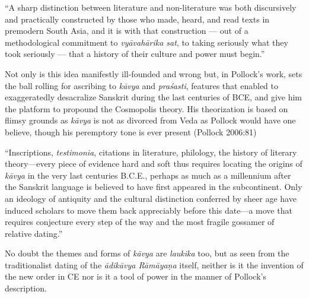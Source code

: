 \begin{myquote}
“A sharp distinction between literature and non-literature was both discursively and practically constructed by those who made, heard, and read texts in premodern South Asia, and it is with that construction — out of a methodological commitment to \textit{vyāvahārika sat}, to taking seriously what they took seriously — that a history of their culture and power must begin.”
\end{myquote}

Not only is this idea manifestly ill-founded and wrong but, in Pollock’s work, sets the ball rolling for ascribing to \textit{kāvya} and \textit{praśasti}, features that enabled to exaggeratedly desacralize Sanskrit during the last centuries of BCE, and give him the platform to propound the Cosmopolis theory. His theorization is based on flimsy grounds as \textit{kāvya} is not as divorced from Veda as Pollock would have one believe, though his peremptory tone is ever present (Pollock 2006:81)

\begin{myquote}
“Inscriptions, \textit{testimonia}, citations in literature, philology, the history of literary theory—every piece of evidence hard and soft thus requires locating the origins of \textit{kāvya} in the very last centuries B.C.E., perhaps as much as a millennium after the Sanskrit language is believed to have first appeared in the subcontinent. Only an ideology of antiquity and the cultural distinction conferred by sheer age have induced scholars to move them back appreciably before this date—a move that requires conjecture every step of the way and the most fragile gossamer of relative dating.”
\end{myquote}

No doubt the themes and forms of \textit{kāvya} are \textit{laukika} too, but as seen from the traditionalist dating of the \textit{ādikāvya Rāmāyaṇa} itself, neither is it the invention of the new order in CE nor is it a tool of power in the manner of Pollock’s description.

